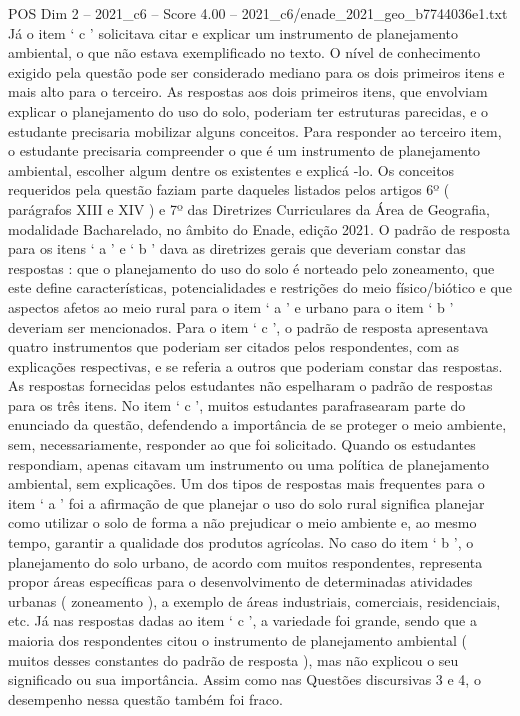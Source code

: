 \begin{textsample}{POS Dim 2 – 2021\_c6 – Score 4.00 – 2021\_c6/enade\_2021\_geo\_b7744036e1.txt}
Já o item ‘ c ’ solicitava citar e explicar um instrumento de planejamento ambiental, o que não estava exemplificado no texto.
O nível de conhecimento exigido pela questão pode ser considerado mediano para os dois primeiros itens e mais alto para o terceiro.
As respostas aos dois primeiros itens, que envolviam explicar o planejamento do uso do solo, poderiam ter estruturas parecidas, e o estudante precisaria mobilizar alguns conceitos.
Para responder ao terceiro item, o estudante precisaria compreender o que é um instrumento de planejamento ambiental, escolher algum dentre os existentes e explicá -lo.
Os conceitos requeridos pela questão faziam parte daqueles listados pelos artigos 6º ( parágrafos XIII e XIV ) e 7º das Diretrizes Curriculares da Área de Geografia, modalidade Bacharelado, no âmbito do Enade, edição 2021.
O padrão de resposta para os itens ‘ a ’ e ‘ b ’ dava as diretrizes gerais que deveriam constar das respostas : que o planejamento do uso do solo é norteado pelo zoneamento, que este define características, potencialidades e restrições do meio físico/biótico e que aspectos afetos ao meio rural para o item ‘ a ’ e urbano para o item ‘ b ’ deveriam ser mencionados.
Para o item ‘ c ’, o padrão de resposta apresentava quatro instrumentos que poderiam ser citados pelos respondentes, com as explicações respectivas, e se referia a outros que poderiam constar das respostas.
As respostas fornecidas pelos estudantes não espelharam o padrão de respostas para os três itens.
No item ‘ c ’, muitos estudantes parafrasearam parte do enunciado da questão, defendendo a importância de se proteger o meio ambiente, sem, necessariamente, responder ao que foi solicitado.
Quando os estudantes respondiam, apenas citavam um instrumento ou uma política de planejamento ambiental, sem explicações.
Um dos tipos de respostas mais frequentes para o item ‘ a ’ foi a afirmação de que planejar o uso do solo rural significa planejar como utilizar o solo de forma a não prejudicar o meio ambiente e, ao mesmo tempo, garantir a qualidade dos produtos agrícolas.
No caso do item ‘ b ’, o planejamento do solo urbano, de acordo com muitos respondentes, representa propor áreas específicas para o desenvolvimento de determinadas atividades urbanas ( zoneamento ), a exemplo de áreas industriais, comerciais, residenciais, etc.
Já nas respostas dadas ao item ‘ c ’, a variedade foi grande, sendo que a maioria dos respondentes citou o instrumento de planejamento ambiental ( muitos desses constantes do padrão de resposta ), mas não explicou o seu significado ou sua importância.
Assim como nas Questões discursivas 3 e 4, o desempenho nessa questão também foi fraco.

\end{textsample}
